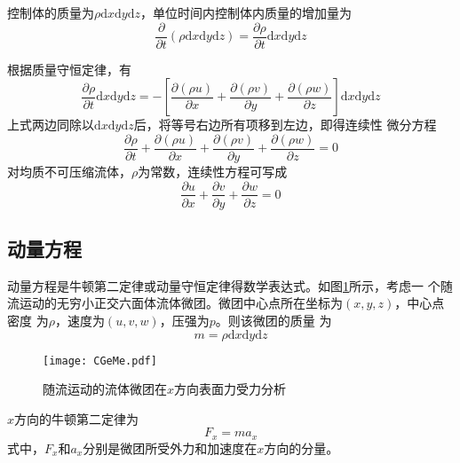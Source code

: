 控制体的质量为$\rho\mathrm{d}x\mathrm{d}y\mathrm{d}z$，单位时间内控制体内质量的增加量为
\begin{equation}
  \frac{\partial}{\partial t}(\rho\mathrm{d}x\mathrm{d}y\mathrm{d}z) =
  \frac{\partial \rho}{\partial  t}\mathrm{d}x\mathrm{d}y\mathrm{d}z
\end{equation}

根据质量守恒定律，有
\begin{equation}
  \frac{\partial \rho}{\partial  t}\mathrm{d}x\mathrm{d}y\mathrm{d}z
  =
  -
  \left[
    \frac {\partial (\rho u)} {\partial x}
    +
    \frac {\partial (\rho v)} {\partial y}
    +
    \frac {\partial (\rho w)} {\partial z}
    \right]
    \mathrm{d}x\mathrm{d}y\mathrm{d}z
\end{equation}
上式两边同除以$\mathrm{d}x\mathrm{d}y\mathrm{d}z$后，将等号右边所有项移到左边，即得连续性
微分方程
\begin{equation}
  \frac{\partial \rho}{\partial  t}
  +
  \frac{\partial (\rho u)}{\partial  x}
  +
  \frac{\partial (\rho v)}{\partial  y}
  +
  \frac{\partial (\rho w)}{\partial  z}
  =
  0
\end{equation}
对均质不可压缩流体，$\rho$为常数，连续性方程可写成
\begin{equation}
  \frac{\partial u}{\partial  x}
  +
  \frac{\partial v}{\partial  y}
  +
  \frac{\partial w}{\partial  z}
  =
  0
  \label{EqCGe_NS_Ce}
\end{equation}

\subsection{动量方程}
动量方程是牛顿第二定律或动量守恒定律得数学表达式。如图\ref{FgCGe_Me}所示，考虑一
个随流运动的无穷小正交六面体流体微团。微团中心点所在坐标为$(x,y,z)$，中心点密度
为$\rho$，速度为$(u, v, w)$，压强为$p$。则该微团的质量
为
\begin{equation}
  m = \rho\mathrm{d}x\mathrm{d}y\mathrm{d}z
\end{equation}

\begin{figure}[hb]
  \centering
  \texttt{[image: CGeMe.pdf]}
  \caption{随流运动的流体微团在$x$方向表面力受力分析}
  \label{FgCGe_Me}
\end{figure}

$x$方向的牛顿第二定律为
\begin{equation}
  F_{x} = ma_{x}
  \label{EqCGe_Nt_x}
\end{equation}
式中，$F_{x}$和$a_{x}$分别是微团所受外力和加速度在$x$方向的分量。

